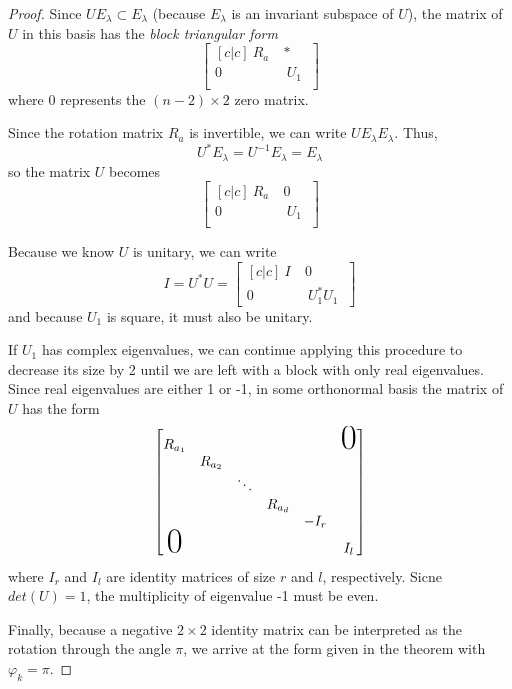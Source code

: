 \begin{proof}
Since $U E_{\lambda} \subset E_{\lambda}$ (because $E_{\lambda}$ is an invariant subspace of $U$), the matrix of $U$ in this basis has the \textit{block triangular form} 
$$\begin{bmatrix}[c|c]
 \: R_{a} \:  & * \\
\hline 
0 & \:  U_{1} \:  \\
\end{bmatrix}$$
where 0 represents the $(n - 2) \times 2$ zero matrix. 

Since the rotation matrix $R_{a}$ is invertible, we can write $UE_{\lambda} E_{\lambda}$. Thus, 
$$U^{*} E_{\lambda} = U^{-1} E_{\lambda} = E_{\lambda}$$
so the matrix $U$ becomes 
$$\begin{bmatrix}[c|c]
 \: R_{a} \:  & 0 \\
\hline 
0 & \:  U_{1} \:  \\
\end{bmatrix}$$

Because we know $U$ is unitary, we can write 
$$I = U^{*}U = \begin{bmatrix}[c|c]
\: I \: & 0 \\
\hline
0 & \: U_{1}^{*} U_{1} \:
\end{bmatrix}$$
and because $U_{1}$ is square, it must also be unitary. 

If $U_{1}$ has complex eigenvalues, we can continue applying this procedure to decrease its size by 2 until we are left with a block with only real eigenvalues. Since real eigenvalues are either 1 or -1, in some orthonormal basis the matrix of $U$ has the form 
$$\begin{bmatrix}
R_{a_{1}} & & & & & \makebox{\Huge 0} \\
 & R_{a_{2}} & & & \\ 
 & & \ddots & & \\
 & & & R_{a_{d}} & \\
 & & & & -I_{r} & \\
 \makebox{\Huge 0} & & & & & I_{l}
\end{bmatrix}$$
where $I_{r}$ and $I_{l}$ are identity matrices of size $r$ and $l$, respectively. Sicne $det(U) = 1$, the multiplicity of eigenvalue -1 must be even. 

Finally, because a negative $2 \times 2$ identity matrix can be interpreted as the rotation through the angle $\pi$, we arrive at the form given in the theorem with $\varphi_{k} = \pi$. 
\end{proof}